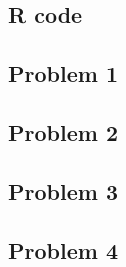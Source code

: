 \begin{appendices}
    \section{R code}

        \subsection*{Problem 1}

        \subsection*{Problem 2}

        \subsection*{Problem 3}

        \subsection*{Problem 4}
\end{appendices}
